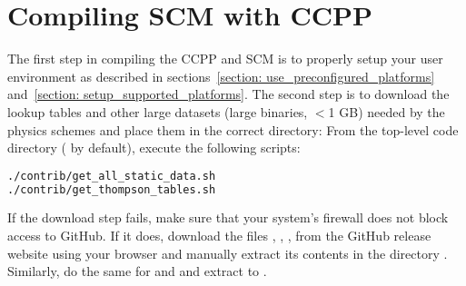 \section{Compiling SCM with CCPP}
\label{section: compiling}
The first step in compiling the CCPP and SCM is to properly setup your user environment as described in sections~\ref{section: use_preconfigured_platforms} and~\ref{section: setup_supported_platforms}. The second step is to download the lookup tables and other large datasets (large binaries, $<$1 GB) needed by the physics schemes and place them in the correct directory:
From the top-level code directory ( by default), execute the following scripts:
\begin{lstlisting}[language=bash]
./contrib/get_all_static_data.sh
./contrib/get_thompson_tables.sh
\end{lstlisting}
If the download step fails, make sure that your system's firewall does not block access to GitHub. If it does, download the files , , ,  from the GitHub release website using your browser and manually extract its contents in the directory . Similarly, do the same for   and  and extract to . 

